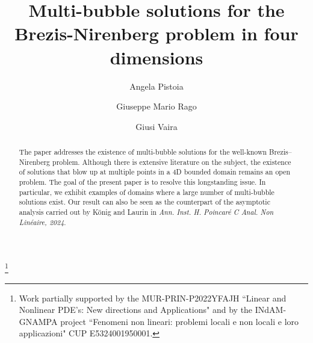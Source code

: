 \documentclass[11pt,a4paper]{amsart}
\theoremstyle{definition}
\renewcommand{\(}{\left(}
\renewcommand{\)}{\right)}
\begin{document}
\title[Multi-bubble solutions for the Brezis-Nirenberg problem in  four dimensions]{Multi-bubble solutions for the Brezis-Nirenberg problem in  four dimensions}


\author[A. Pistoia]{Angela Pistoia}
\address{\noindent  Dipartimento di Scienze di Base e Applicate per l'Ingegneria, Università degli Studi di Roma Sapienza}

\author[G. M. Rago]{Giuseppe Mario Rago}
\address{\noindent  Dipartimento di Matematica, Universit\'a degli Studi di Bari Aldo Moro,Italy }

\author[G. Vaira]{Giusi Vaira}
\address{\noindent  Dipartimento di Matematica, Universit\'a degli Studi di Bari Aldo Moro,Italy }
\thanks{Work partially supported by 
the MUR-PRIN-P2022YFAJH ``Linear and Nonlinear PDE’s: New directions and Applications" and by the INdAM-GNAMPA project ``Fenomeni non lineari: problemi locali e non locali e loro applicazioni" CUP E5324001950001.}







\maketitle
\begin{abstract}
The paper addresses the existence of multi-bubble solutions for the well-known Brezis–Nirenberg problem.
Although there is extensive literature on the subject, the existence of solutions that blow up at multiple points in a 4D bounded domain remains an open problem.
The goal of the present paper is to resolve this longstanding issue. In particular, we exhibit examples of domains where a large number of multi-bubble solutions exist.
Our result can also be seen as the counterpart of the asymptotic analysis carried out by König and Laurin in
{\em Ann. Inst. H. Poincar\'e C Anal. Non Lin\'eaire, 2024}.
\end{abstract}
\end{document}
